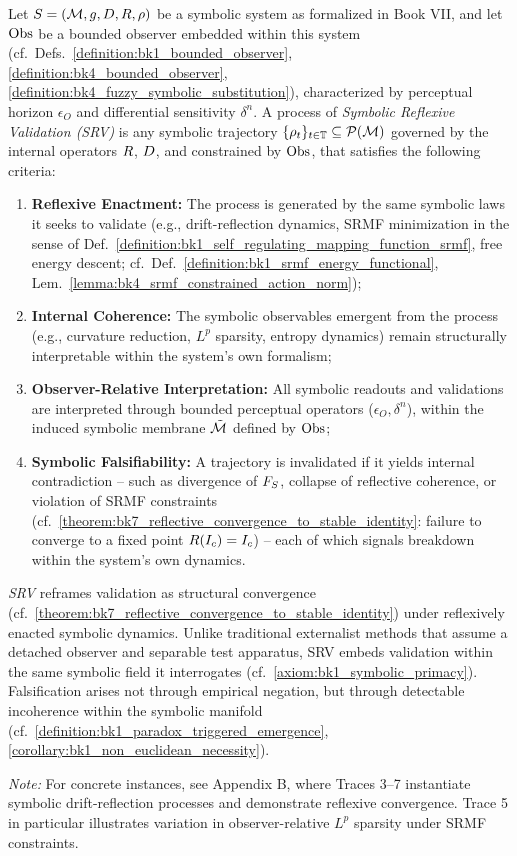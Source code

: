 \begin{definition}
\label{definition:bk7_symbolic_reflexive_validation_srv}
Let $S = (\mathcal{M}, g, D, R, \rho)$ be a symbolic system as formalized in Book VII, and let $\mathrm{Obs}$ be a bounded observer embedded within this system (cf.~Defs.~\ref{definition:bk1_bounded_observer}, \ref{definition:bk4_bounded_observer}, \ref{definition:bk4_fuzzy_symbolic_substitution}), characterized by perceptual horizon $\epsilon_O$ and differential sensitivity $\delta^n$. A process of \emph{Symbolic Reflexive Validation (SRV)} is any symbolic trajectory $\{\rho_t\}_{t \in \mathbb{T}} \subseteq \mathcal{P}(\mathcal{M})$ governed by the internal operators $R$, $D$, and constrained by $\mathrm{Obs}$, that satisfies the following criteria:
\begin{enumerate}[label=(\roman*)]
\item \textbf{Reflexive Enactment:} The process is generated by the same symbolic laws it seeks to validate (e.g., drift-reflection dynamics, SRMF minimization in the sense of Def.~\ref{definition:bk1_self_regulating_mapping_function_srmf}, free energy descent; cf.~Def.~\ref{definition:bk1_srmf_energy_functional}, Lem.~\ref{lemma:bk4_srmf_constrained_action_norm});
\item \textbf{Internal Coherence:} The symbolic observables emergent from the process (e.g., curvature reduction, $L^p$ sparsity, entropy dynamics) remain structurally interpretable within the system's own formalism;
\item \textbf{Observer-Relative Interpretation:} All symbolic readouts and validations are interpreted through bounded perceptual operators ($\epsilon_O, \delta^n$), within the induced symbolic membrane $\tilde{\mathcal{M}}$ defined by $\mathrm{Obs}$;
\item \textbf{Symbolic Falsifiability:}
A trajectory is invalidated if it yields internal contradiction --
such as divergence of \( F_S \), collapse of reflective coherence,
or violation of SRMF constraints (cf.~\ref{theorem:bk7_reflective_convergence_to_stable_identity}: failure to converge to a fixed point $R(I_c)=I_c$) --
each of which signals breakdown within the system's own dynamics.
\end{enumerate}
\emph{SRV} reframes validation as structural convergence (cf.~\ref{theorem:bk7_reflective_convergence_to_stable_identity}) under reflexively enacted symbolic dynamics. Unlike traditional externalist methods that assume a detached observer and separable test apparatus, SRV embeds validation within the same symbolic field it interrogates (cf.~\ref{axiom:bk1_symbolic_primacy}). Falsification arises not through empirical negation, but through detectable incoherence within the symbolic manifold (cf.~\ref{definition:bk1_paradox_triggered_emergence}, \ref{corollary:bk1_non_euclidean_necessity}).

\medskip\noindent\textit{Note:} For concrete instances, see Appendix B, where Traces 3--7 instantiate symbolic drift-reflection processes and demonstrate reflexive convergence. Trace 5 in particular illustrates variation in observer-relative $L^p$ sparsity under SRMF constraints.
\end{definition}
